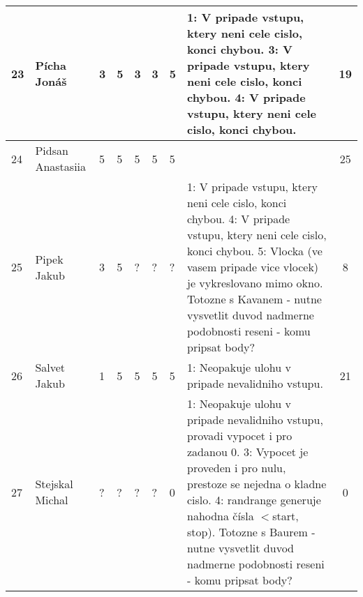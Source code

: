 \documentclass[landscape, 12pt]{article}
\begin{document}
\begin{longtable}{|l l | C{0.7cm} | C{0.7cm} | C{0.7cm} | C{0.7cm} | C{0.7cm} | L{15cm} |c|}
  23 & Pícha Jonáš        &       3 &       5 &       3 &       3 &       5 & 1: V pripade vstupu, ktery neni cele cislo, konci chybou. 3: V pripade vstupu, ktery neni cele cislo, konci chybou. 4: V pripade vstupu, ktery neni cele cislo, konci chybou.                                                                                                                                                                                                                             &       19 \\
\hline

  24 & Pidsan Anastasiia  &       5 &       5 &       5 &       5 &       5 &                                                                                                                                                                                                                                                                                                                                                                                      &       25 \\
\hline

  25 & Pipek Jakub        &       3 &       5 &       ? &       ? &       ? & 1: V pripade vstupu, ktery neni cele cislo, konci chybou. 4: V pripade vstupu, ktery neni cele cislo, konci chybou. 5: Vlocka (ve vasem pripade vice vlocek) je vykreslovano mimo okno.                                                                                                                Totozne s Kavanem - nutne vysvetlit duvod nadmerne podobnosti reseni - komu pripsat body?                                                                                                                   &       8 \\
\hline

  26 & Salvet Jakub       &       1 &       5 &       5 &       5 &       5 & 1: Neopakuje ulohu v pripade nevalidniho vstupu.                                                                                                                                                                                                                                                                                                                                        &       21 \\
\hline

  27 & Stejskal Michal    &       ? &       ? &       ? &       ? &       0 & 1: Neopakuje ulohu v pripade nevalidniho vstupu, provadi vypocet i pro zadanou 0. 3: Vypocet je proveden i pro nulu, prestoze se nejedna o kladne cislo. 4: randrange generuje nahodna čísla \ensuremath{<}start, stop). Totozne s Baurem - nutne vysvetlit duvod nadmerne podobnosti reseni - komu pripsat body?                                                                                                                                                                                  &       0 \\
\hline


\end{longtable}
\end{document}
